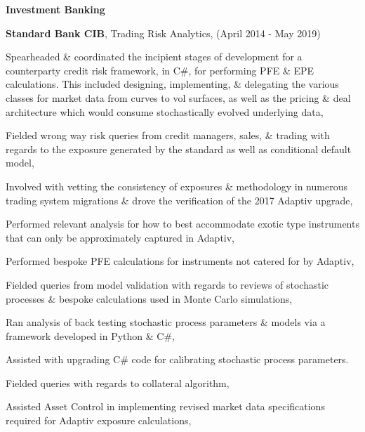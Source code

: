 \documentclass[11pt]{article}
\newenvironment{outerlist}[1][\enskip\textbullet]%
        {\begin{itemize}[#1]}{\end{itemize}%
         \vspace{-.6\baselineskip}}
\newenvironment{innerlist}[1][\enskip\textbullet]%
        {\begin{compactitem}[#1]}{\end{compactitem}}
\begin{document}
\textbf{Investment Banking}

\begin{outerlist}
	\item[] \textbf{\textcolor{customaqua}{Standard Bank CIB}}, Trading Risk Analytics, (April 2014 - May 2019)
	\begin{innerlist}
		\item Spearheaded \& coordinated the incipient stages of development for a counterparty credit 
			 risk framework, in C\#, for performing PFE \& EPE calculations. This included designing, 
			 implementing, \& delegating the various classes for market data from curves to vol 
			 surfaces, as well as the pricing \& deal architecture which would consume stochastically 
			 evolved underlying data,
		\item Fielded wrong way risk queries from credit managers, sales, \& trading with regards to the 
			 exposure generated by the standard as well as conditional default model,
		\item Involved with vetting the consistency of exposures \& methodology in numerous trading
			 system migrations \& drove the verification of the 2017 Adaptiv upgrade,
		\item Performed relevant analysis for how to best accommodate exotic type instruments that can
			 only be approximately captured in Adaptiv,
		\item Performed bespoke PFE calculations for instruments not catered for by Adaptiv,
		\item Fielded queries from model validation with regards to reviews of stochastic processes \&
			  bespoke calculations used in Monte Carlo simulations,
		\item Ran analysis of back testing stochastic process parameters \& models via a framework 
			  developed in Python \& C\#,
		\item Assisted with upgrading C\# code for calibrating stochastic process parameters. 
		\item Fielded queries with regards to collateral algorithm,
		\item Assisted Asset Control in implementing revised market data specifications required for 
			 Adaptiv exposure calculations,
	\end{innerlist}
					

\end{outerlist}
\end{document}
